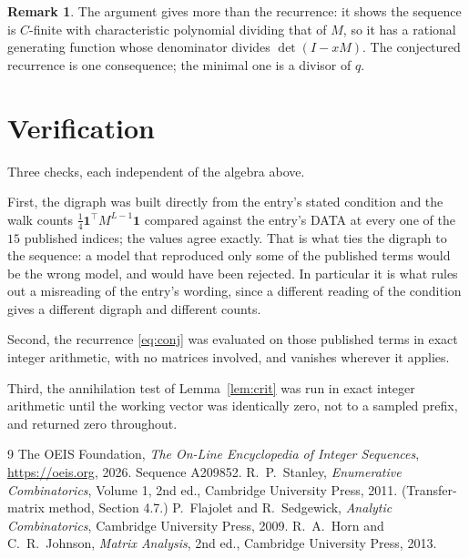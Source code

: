 \documentclass[11pt,a4paper]{article}
\theoremstyle{plain}
\theoremstyle{definition}
\newtheorem{remark}[theorem]{Remark}
\begin{document}
\begin{remark}
The argument gives more than the recurrence: it shows the sequence is $C$-finite with
characteristic polynomial dividing that of $M$, so it has a rational generating function
whose denominator divides $\det(I-xM)$. The conjectured recurrence is one consequence; the
minimal one is a divisor of $q$.
\end{remark}

\section{Verification}

Three checks, each independent of the algebra above.

First, the digraph was built directly from the entry's stated condition and the walk counts
$\tfrac1{4}\mathbf{1}^{\!\top}M^{L-1}\mathbf{1}$ compared against the entry's DATA at
every one of the $15$ published indices; the values agree exactly. That is what ties
the digraph to the sequence: a model that reproduced only some of the published terms would
be the wrong model, and would have been rejected. In particular it is what rules out a
misreading of the entry's wording, since a different reading of the condition gives a
different digraph and different counts.

Second, the recurrence \eqref{eq:conj} was evaluated on those published terms in exact
integer arithmetic, with no matrices involved, and vanishes wherever it applies.

Third, the annihilation test of Lemma~\ref{lem:crit} was run in exact integer arithmetic
until the working vector was identically zero, not to a sampled prefix, and returned zero
throughout.

\begin{thebibliography}{9}
 The OEIS Foundation, \emph{The On-Line Encyclopedia of Integer
Sequences}, \url{https://oeis.org}, 2026. Sequence A209852.
 R.~P.~Stanley, \emph{Enumerative Combinatorics}, Volume 1, 2nd ed.,
Cambridge University Press, 2011. (Transfer-matrix method, Section 4.7.)
 P.~Flajolet and R.~Sedgewick, \emph{Analytic Combinatorics}, Cambridge
University Press, 2009.
 R.~A.~Horn and C.~R.~Johnson, \emph{Matrix Analysis}, 2nd ed., Cambridge
University Press, 2013.
\end{thebibliography}
\end{document}
